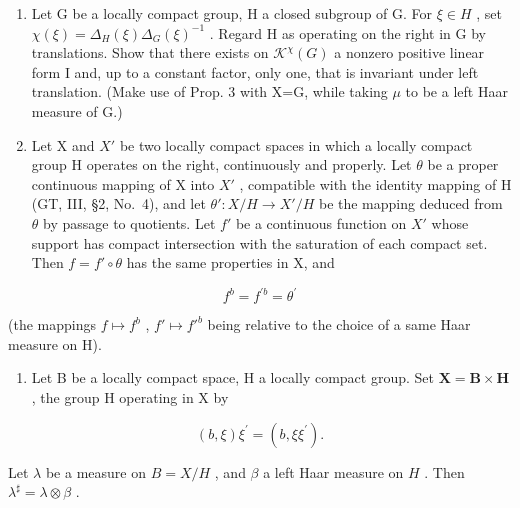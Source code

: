 \exercisesection{}

\begin{enumerate}
\def\labelenumi{\arabic{enumi})}
\item
  Let G be a locally compact group, H a closed subgroup of G. For \(\xi\in H\) , set \(\chi(\xi)=\Delta_{H}(\xi)\Delta_{G}(\xi)^{-1}\) . Regard H as operating on the right in G by translations. Show that there exists on \(\mathcal{K}^{\chi}(G)\) a nonzero positive linear form I and, up to a constant factor, only one, that is invariant under left translation. (Make use of Prop. 3 with X=G, while taking \(\mu\) to be a left Haar measure of G.)
\item
  Let X and \(X'\) be two locally compact spaces in which a locally compact group H operates on the right, continuously and properly. Let \(\theta\) be a proper continuous mapping of X into \(X'\) , compatible with the identity mapping of H (GT, III, §2, No.~4), and let \(\theta': X/H \to X'/H\) be the mapping deduced from \(\theta\) by passage to quotients. Let \(f'\) be a continuous function on \(X'\) whose support has compact intersection with the saturation of each compact set. Then \(f = f' \circ \theta\) has the same properties in X, and
\end{enumerate}

\[
f ^ {b} = f ^ {\prime b} = \theta^ {\prime}
\]

(the mappings \(f \mapsto f^b\) , \(f' \mapsto f'^b\) being relative to the choice of a same Haar measure on H).

\begin{enumerate}
\def\labelenumi{\arabic{enumi})}
\setcounter{enumi}{2}
\tightlist
\item
  Let B be a locally compact space, H a locally compact group. Set \(\mathbf{X} = \mathbf{B} \times \mathbf{H}\) , the group H operating in X by
\end{enumerate}

\[
(b, \xi) \xi^ {\prime} = (b, \xi \xi^ {\prime}).
\]

Let \(\lambda\) be a measure on \(B = X / H\) , and \(\beta\) a left Haar measure on \(H\) . Then \(\lambda^{\sharp} = \lambda \otimes \beta\) .

